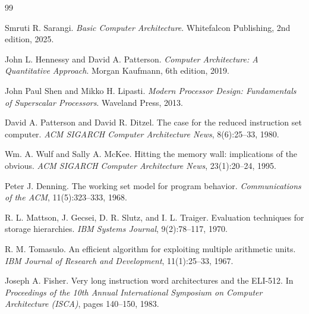 \documentclass[12pt,a4paper]{report}
\begin{document}


\begin{thebibliography}{99}
\raggedright

Smruti R. Sarangi.
\emph{Basic Computer Architecture}.
Whitefalcon Publishing, 2nd edition, 2025.

John L. Hennessy and David A. Patterson.
\emph{Computer Architecture: A Quantitative Approach}.
Morgan Kaufmann, 6th edition, 2019.

John Paul Shen and Mikko H. Lipasti.
\emph{Modern Processor Design: Fundamentals of Superscalar Processors}.
Waveland Press, 2013.

David A. Patterson and David R. Ditzel.
The case for the reduced instruction set computer.
\emph{ACM SIGARCH Computer Architecture News}, 8(6):25--33, 1980.

Wm. A. Wulf and Sally A. McKee.
Hitting the memory wall: implications of the obvious.
\emph{ACM SIGARCH Computer Architecture News}, 23(1):20--24, 1995.

Peter J. Denning.
The working set model for program behavior.
\emph{Communications of the ACM}, 11(5):323--333, 1968.

R. L. Mattson, J. Gecsei, D. R. Slutz, and I. L. Traiger.
Evaluation techniques for storage hierarchies.
\emph{IBM Systems Journal}, 9(2):78--117, 1970.

R. M. Tomasulo.
An efficient algorithm for exploiting multiple arithmetic units.
\emph{IBM Journal of Research and Development}, 11(1):25--33, 1967.

Joseph A. Fisher.
Very long instruction word architectures and the ELI-512.
In \emph{Proceedings of the 10th Annual International Symposium on
Computer Architecture (ISCA)}, pages 140--150, 1983.


\end{thebibliography}
\end{document}
